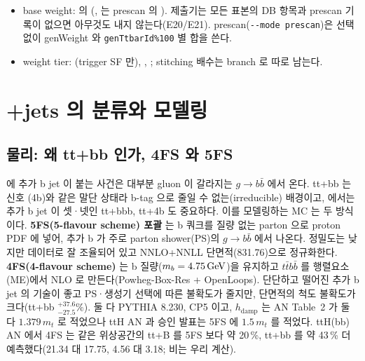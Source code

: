 \begin{impl}
\begin{itemize}
  \item base weight:  의 (,  는 prescan 의
        ). 제출기는 모든 표본의 DB 항목과 prescan 기록이 없으면 아무것도 내지 않는다(E20/E21). prescan(\texttt{-{}-mode prescan})은
        선택 없이 genWeight 와 \texttt{genTtbarId\%100} 별 합을 쓴다.
  \item weight tier: (trigger SF 만), , ; stitching 배수는  branch 로 따로 남는다.
\end{itemize}
\end{impl}

\section{\texorpdfstring{\ttbar}{ttbar}+jets 의 분류와 모델링}\label{sec:samples-ttjets}

\subsection{물리: 왜 tt+bb 인가, 4FS 와 5FS}\label{sec:samples-ttbb-physics}

\ttbar 에 추가 b jet 이 붙는 사건은 대부분 gluon 이 갈라지는 $g\to b\bar b$ 에서 온다. tt+bb 는 신호 \ttHH(4b)와 같은 말단 상태라
b-tag 으로 줄일 수 없는(irreducible) 배경이고, \ttHH 에서는 추가 b jet 이 셋·넷인 tt+bbb, tt+4b 도 중요하다. 이를 모델링하는 MC 는
두 방식이다. \textbf{5FS(5-flavour scheme) 포괄 \ttbar} 는 b 쿼크를 질량 없는 parton 으로 proton PDF 에 넣어, 추가 b 가 주로 parton shower(PS)의 $g\to b\bar b$ 에서
나온다. 정밀도는 낮지만 데이터로 잘 조율되어 있고 NNLO+NNLL 단면적(831.76\pb)으로 정규화한다. \textbf{4FS(4-flavour scheme) \ttbb} 는
b 질량($m_b=4.75\,\mathrm{GeV}$)을 유지하고 $t\bar tb\bar b$ 를 행렬요소(ME)에서 NLO 로 만든다(Powheg-Box-Res + OpenLoops). 단단하고 떨어진 추가 b jet 의 기술이 좋고
PS·생성기 선택에 따른 불확도가 줄지만, 단면적의 척도 불확도가 크다(tt+bb $^{+37.6}_{-27.5}\%$).
둘 다 PYTHIA 8.230, CP5 이고, $h_{\mathrm{damp}}$ 는 AN Table~2 가 둘 다 $1.379\,m_t$ 로 적었으나 ttH AN 과 승인 발표는
5FS 에 $1.5\,m_t$ 를 적었다. ttH(bb) AN 에서 4FS 는 같은 위상공간의 tt+B 를 5FS 보다 약 20\,\%, tt+bb 를 약 43\,\% 더
예측했다(21.34 대 17.75\pb, 4.56 대 3.18\pb; 비는 우리 계산).

